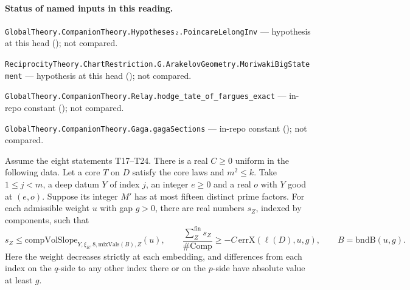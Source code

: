 

\paragraph{Status of named inputs in this reading.}
\noindent\nolinkurl{GlobalTheory.CompanionTheory.Hypotheses₂.PoincareLelongInv} --- hypothesis at this head (); not compared.\par
\noindent\nolinkurl{ReciprocityTheory.ChartRestriction.G.ArakelovGeometry.MoriwakiBigStatement} --- hypothesis at this head (); not compared.\par
\noindent\nolinkurl{GlobalTheory.CompanionTheory.Relay.hodge_tate_of_fargues_exact} --- in-repo constant (); not compared.\par
\noindent\nolinkurl{GlobalTheory.CompanionTheory.Gaga.gagaSections} --- in-repo constant (); not compared.\par

\begin{formalstatement}\label{sub:T14}

Assume the eight statements T17--T24. There is a real $C\ge0$ uniform in
the following data. Let a core $T$ on $D$ satisfy the core laws and
$m^2\le k$. Take $1\le j<m$, a deep datum $Y$ of index $j$, an integer
$e\ge0$ and a real $o$ with $Y$ good at $(e,o)$. Suppose its integer
$M'$ has at most fifteen distinct prime factors. For each admissible
weight $u$ with gap $g>0$, there are real numbers $s_Z$, indexed by
components, such that
\[
  s_Z\le\mathrm{compVolSlope}_{Y,\xi_R,8,\mathrm{mixVals}(B),Z}(u),
  \qquad
  \frac{\sum_Z^{\mathrm{fin}}s_Z}{\#\mathrm{Comp}}
   \ge -C\,\mathrm{errX}(\ell(D),u,g),\qquad B=\mathrm{bndB}(u,g).
\]
Here the weight decreases strictly at each embedding, and differences
from each index on the $q$-side to any other index there or on the
$p$-side have absolute value at least $g$.

\end{formalstatement}

